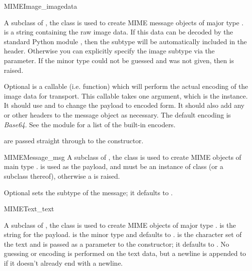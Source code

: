 \begin{classdesc}{MIMEImage}{_imagedata}

A subclass of , the  class is
used to create MIME message objects of major type .
 is a string containing the raw image data.  If this
data can be decoded by the standard Python module ,
then the subtype will be automatically included in the
 header.  Otherwise you can explicitly specify the
image subtype via the  parameter.  If the minor type could
not be guessed and  was not given, then 
is raised.

Optional  is a callable (i.e. function) which will
perform the actual encoding of the image data for transport.  This
callable takes one argument, which is the  instance.
It should use  and  to
change the payload to encoded form.  It should also add any
 or other headers to the message
object as necessary.  The default encoding is \emph{Base64}.  See the
 module for a list of the built-in encoders.

 are passed straight through to the 
constructor.
\end{classdesc}

\begin{classdesc}{MIMEMessage}{_msg}
A subclass of , the  class
is used to create MIME objects of main type .
 is used as the payload, and must be an instance of class
 (or a subclass thereof), otherwise a
 is raised.

Optional  sets the subtype of the message; it defaults
to .
\end{classdesc}

\begin{classdesc}{MIMEText}{_text}

A subclass of , the  class is
used to create MIME objects of major type .
 is the string for the payload.   is the
minor type and defaults to .   is the
character set of the text and is passed as a parameter to the
 constructor; it defaults to .  No
guessing or encoding is performed on the text data, but a newline is
appended to  if it doesn't already end with a newline.

\end{classdesc}

